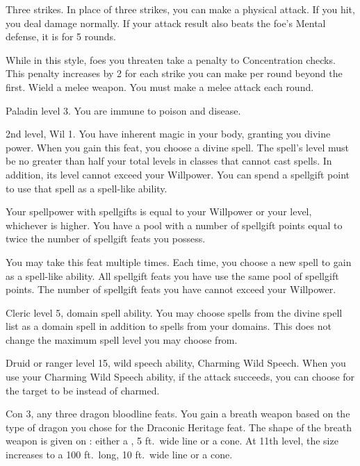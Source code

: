 \featpre Three strikes.
\featben In place of three strikes, you can make a physical attack.
If you hit, you deal damage normally.
If your attack result also beats the foe's Mental defense, it is \disoriented for 5 rounds.

\featben While in this style, foes you threaten take a  penalty to Concentration checks.
This penalty increases by 2 for each strike you can make per round beyond the first.
\stylereq Wield a melee weapon. You must make a melee attack each round.

\featpre Paladin level 3.
\featben You are immune to poison and disease.

\featpres 2nd level, Wil 1.
\featben You have inherent magic in your body, granting you divine power.
When you gain this feat, you choose a divine spell.
The spell's level must be no greater than half your total levels in classes that cannot cast spells.
In addition, its level cannot exceed your Willpower.
You can spend a spellgift point to use that spell as a spell-like ability.

Your spellpower with spellgifts is equal to your Willpower or your level, whichever is higher.
You have a pool with a number of spellgift points equal to twice the number of spellgift feats you possess.

You may take this feat multiple times.
Each time, you choose a new spell to gain as a spell-like ability.
All spellgift feats you have use the same pool of spellgift points.
The number of spellgift feats you have cannot exceed your Willpower.

\featpres Cleric level 5, domain spell ability.
\featben You may choose spells from the divine spell list as a domain spell in addition to spells from your domains.
This does not change the maximum spell level you may choose from.

\featpres Druid or ranger level 15, wild speech ability, Charming Wild Speech.
\featben When you use your Charming Wild Speech ability, if the attack succeeds, you can choose for the target to be \dominated instead of charmed.

\featpres Con 3, any three dragon bloodline feats.
\featben You gain a breath weapon based on the type of dragon you chose for the Draconic Heritage feat.
The shape of the breath weapon is given on : either a \arealarge, 5 ft.\ wide line or a \areamed cone.
At 11th level, the size increases to a 100 ft.\ long, 10 ft.\ wide line or a \arealarge cone.

